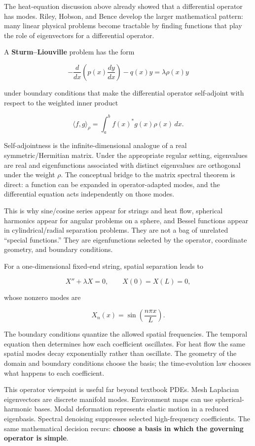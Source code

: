 The heat-equation discussion above already showed that a differential operator has modes. Riley, Hobson, and Bence develop the larger mathematical pattern: many linear physical problems become tractable by finding functions that play the role of eigenvectors for a differential operator.

A \textbf{Sturm--Liouville} problem has the form

\[
-\frac{d}{dx}
\left(
p(x)\frac{dy}{dx}
\right)
-q(x)y
=
\lambda \rho(x)y
\]

under boundary conditions that make the differential operator self-adjoint with respect to the weighted inner product

\[
\langle f,g\rangle_\rho
=
\int_a^b
f(x)^*g(x)\rho(x)\,dx.
\]

Self-adjointness is the infinite-dimensional analogue of a real symmetric/Hermitian matrix. Under the appropriate regular setting, eigenvalues are real and eigenfunctions associated with distinct eigenvalues are orthogonal under the weight \(\rho\). The conceptual bridge to the matrix spectral theorem is direct: a function can be expanded in operator-adapted modes, and the differential equation acts independently on those modes.

This is why sine/cosine series appear for strings and heat flow, spherical harmonics appear for angular problems on a sphere, and Bessel functions appear in cylindrical/radial separation problems. They are not a bag of unrelated ``special functions.'' They are eigenfunctions selected by the operator, coordinate geometry, and boundary conditions.

For a one-dimensional fixed-end string, spatial separation leads to

\[
X''+\lambda X=0,
\qquad
X(0)=X(L)=0,
\]

whose nonzero modes are

\[
X_n(x)=
\sin\left(\frac{n\pi x}{L}\right).
\]

The boundary conditions quantize the allowed spatial frequencies. The temporal equation then determines how each coefficient oscillates. For heat flow the same spatial modes decay exponentially rather than oscillate. The geometry of the domain and boundary conditions choose the basis; the time-evolution law chooses what happens to each coefficient.

This operator viewpoint is useful far beyond textbook PDEs. Mesh Laplacian eigenvectors are discrete manifold modes. Environment maps can use spherical-harmonic bases. Modal deformation represents elastic motion in a reduced eigenbasis. Spectral denoising suppresses selected high-frequency coefficients. The same mathematical decision recurs: \textbf{choose a basis in which the governing operator is simple}.

